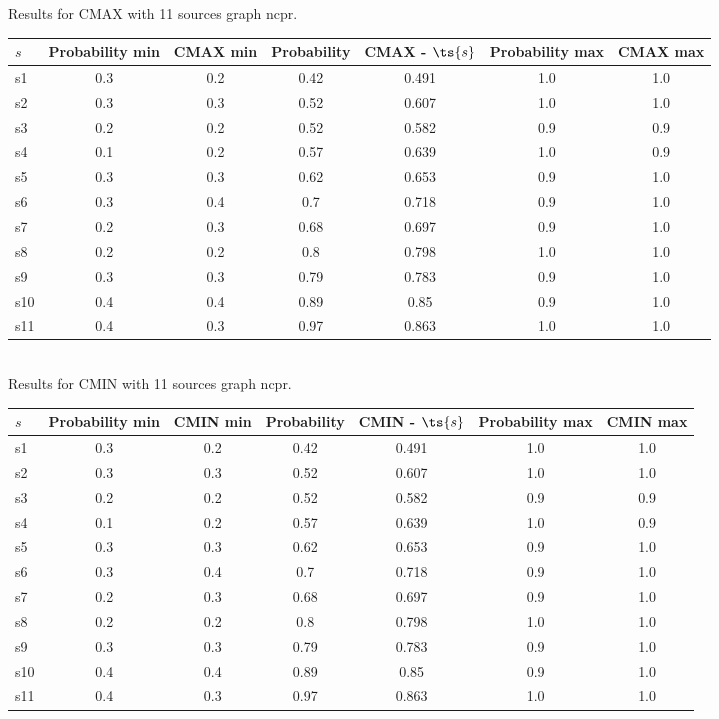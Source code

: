 \documentclass{article}
\begin{document}
\noindent Results for CMAX with 11 sources graph ncpr.

\noindent\begin{tabular}{|l|c|c|c|c|c|c|}
\hline
$s$& Probability min & CMAX min & Probability & CMAX - $\ts{s}$ & Probability max & CMAX max\\
\hline
s1 &0.3 & 0.2 & 0.42 & 0.491 & 1.0 & 1.0\\
\hline
s2 &0.3 & 0.3 & 0.52 & 0.607 & 1.0 & 1.0\\
\hline
s3 &0.2 & 0.2 & 0.52 & 0.582 & 0.9 & 0.9\\
\hline
s4 &0.1 & 0.2 & 0.57 & 0.639 & 1.0 & 0.9\\
\hline
s5 &0.3 & 0.3 & 0.62 & 0.653 & 0.9 & 1.0\\
\hline
s6 &0.3 & 0.4 & 0.7 & 0.718 & 0.9 & 1.0\\
\hline
s7 &0.2 & 0.3 & 0.68 & 0.697 & 0.9 & 1.0\\
\hline
s8 &0.2 & 0.2 & 0.8 & 0.798 & 1.0 & 1.0\\
\hline
s9 &0.3 & 0.3 & 0.79 & 0.783 & 0.9 & 1.0\\
\hline
s10 &0.4 & 0.4 & 0.89 & 0.85 & 0.9 & 1.0\\
\hline
s11 &0.4 & 0.3 & 0.97 & 0.863 & 1.0 & 1.0\\
\hline
\end{tabular}\\

\noindent Results for CMIN with 11 sources graph ncpr.

\noindent\begin{tabular}{|l|c|c|c|c|c|c|}
\hline
$s$& Probability min & CMIN min & Probability & CMIN - $\ts{s}$ & Probability max & CMIN max\\
\hline
s1 &0.3 & 0.2 & 0.42 & 0.491 & 1.0 & 1.0\\
\hline
s2 &0.3 & 0.3 & 0.52 & 0.607 & 1.0 & 1.0\\
\hline
s3 &0.2 & 0.2 & 0.52 & 0.582 & 0.9 & 0.9\\
\hline
s4 &0.1 & 0.2 & 0.57 & 0.639 & 1.0 & 0.9\\
\hline
s5 &0.3 & 0.3 & 0.62 & 0.653 & 0.9 & 1.0\\
\hline
s6 &0.3 & 0.4 & 0.7 & 0.718 & 0.9 & 1.0\\
\hline
s7 &0.2 & 0.3 & 0.68 & 0.697 & 0.9 & 1.0\\
\hline
s8 &0.2 & 0.2 & 0.8 & 0.798 & 1.0 & 1.0\\
\hline
s9 &0.3 & 0.3 & 0.79 & 0.783 & 0.9 & 1.0\\
\hline
s10 &0.4 & 0.4 & 0.89 & 0.85 & 0.9 & 1.0\\
\hline
s11 &0.4 & 0.3 & 0.97 & 0.863 & 1.0 & 1.0\\
\hline
\end{tabular}\\
\end{document}
